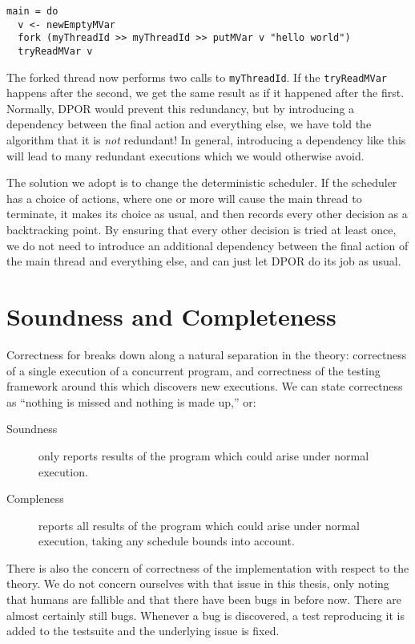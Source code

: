 \begin{verbatim}
main = do
  v <- newEmptyMVar
  fork (myThreadId >> myThreadId >> putMVar v "hello world")
  tryReadMVar v
\end{verbatim}

The forked thread now performs two calls to \verb|myThreadId|.  If the
\verb|tryReadMVar| happens after the second, we get the same result as
if it happened after the first.  Normally, DPOR would prevent this
redundancy, but by introducing a dependency between the final action
and everything else, we have told the algorithm that it is \emph{not}
redundant!  In general, introducing a dependency like this will lead
to many redundant executions which we would otherwise avoid.

The solution we adopt is to change the deterministic scheduler.  If
the scheduler has a choice of actions, where one or more will cause
the main thread to terminate, it makes its choice as usual, and then
records every other decision as a backtracking point.  By ensuring
that every other decision is tried at least once, we do not need to
introduce an additional dependency between the final action of the
main thread and everything else, and can just let DPOR do its job as
usual.

\section{Soundness and Completeness}
\label{sec:dejafu-correctness}

Correctness for \dejafu{} breaks down along a natural separation in
the theory: correctness of a single execution of a concurrent program,
and correctness of the testing framework around this which discovers
new executions.  We can state correctness as ``nothing is missed and
nothing is made up,'' or:

\begin{description}
\item[Soundness] \dejafu{} only reports results of the program which
  could arise under normal execution.
\item[Compleness] \dejafu{} reports all results of the program which
  could arise under normal execution, taking any schedule bounds into
  account.
\end{description}

There is also the concern of correctness of the implementation with
respect to the theory.  We do not concern ourselves with that issue in
this thesis, only noting that humans are fallible and that there have
been bugs in \dejafu{} before now.  There are almost certainly still
bugs.  Whenever a bug is discovered, a test reproducing it is added to
the testsuite and the underlying issue is fixed.

